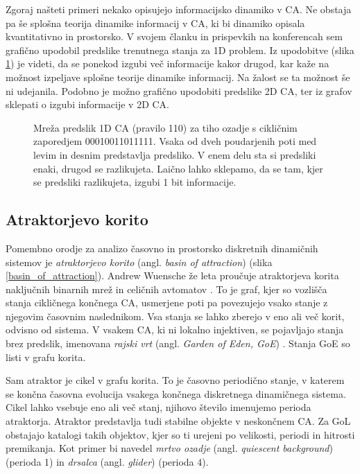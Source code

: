 \documentclass[12pt,a4paper,openany,twoside]{book}
\begin{document}
Zgoraj našteti primeri nekako opisujejo informacijsko dinamiko v CA.
Ne obstaja pa še splošna teorija dinamike informacij v CA,
ki bi dinamiko opisala kvantitativno in prostorsko.
V svojem članku \cite{JerasDobnikar2007} in prispevkih na konferencah \cite{DBLP:conf/iccS/JerasD06, DBLP:conf/automata/Jeras08, Jeras2008-pyca}
sem grafično upodobil predslike trenutnega stanja za 1D problem.
Iz upodobitve (slika \ref{network_rule110_quiescent}) je videti, da se ponekod izgubi več informacije kakor drugod,
kar kaže na možnost izpeljave splošne teorije dinamike informacij.
Na žalost se ta možnost še ni udejanila. Podobno je možno grafično upodobiti predslike 2D CA,
ter iz grafov sklepati o izgubi informacije v 2D CA.

\vspace{10mm}
\begin{figure}[htb]
\centerline{}
\caption[Mreža predslik 1D CA.]
{Mreža predslik 1D CA (pravilo 110) za tiho ozadje s cikličnim zaporedjem 00010011011111.
Vsaka od dveh poudarjenih poti med levim in desnim predstavlja predsliko.
V enem delu sta si predsliki enaki, drugod se razlikujeta.
Laično lahko sklepamo, da se tam, kjer se predsliki razlikujeta, izgubi 1 bit informacije.}
\label{network_rule110_quiescent}
\end{figure}
\vspace{5mm}

\subsection{Atraktorjevo korito}

Pomembno orodje za analizo časovno in prostorsko diskretnih dinamičnih sistemov
je \emph{atraktorjevo korito} (angl. \emph{basin of attraction}) (slika \ref{basin_of_attraction}).
Andrew Wuensche že leta proučuje atraktorjeva korita naključnih binarnih mrež in celičnih avtomatov \cite{Wuensche1992, WuenscheDDLab}.
To je graf, kjer so vozlišča stanja cikličnega končnega CA,
usmerjene poti pa povezujejo vsako stanje z njegovim časovnim naslednikom.
Vsa stanja se lahko zberejo v eno ali več korit, odvisno od sistema.
V vsakem CA, ki ni lokalno injektiven, se pojavljajo stanja brez predslik,
imenovana \emph{rajski vrt} (angl. \emph{Garden of Eden, GoE}) \cite{Moore1962, Myhill1963}.
Stanja GoE so listi v grafu korita.

Sam atraktor je cikel v grafu korita.
To je časovno periodično stanje, v katerem se končna časovna evolucija vsakega končnega diskretnega dinamičnega sistema.
Cikel lahko vsebuje eno ali več stanj, njihovo število imenujemo perioda atraktorja.
Atraktor predstavlja tudi stabilne objekte v neskončnem CA.
Za GoL obstajajo katalogi takih objektov, kjer so ti urejeni po velikosti, periodi in hitrosti premikanja.
Kot primer bi navedel \emph{mrtvo ozadje} (angl. \emph{quiescent background}) (perioda 1)
in \emph{drsalca} (angl. \emph{glider}) (perioda 4).
\end{document}
